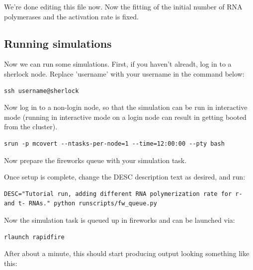 \documentclass[12pt]{article}
\begin{document}
We’re done editing this file now. Now the fitting of the initial number of RNA polymerases and the activation rate is fixed. 




\subsection{Running simulations}

Now we can run some simulations. First, if you haven't alreadt, log in to a sherlock node. Replace 'username' with your username in the command below:

\lstset{language=bash}
\begin{lstlisting}
ssh username@sherlock
\end{lstlisting}

Now log in to a non-login node, so that the simulation can be run in interactive mode (running in interactive mode on a login node can result in getting booted from the cluster).

\begin{lstlisting}
srun -p mcovert --ntasks-per-node=1 --time=12:00:00 --pty bash
\end{lstlisting}

Now prepare the fireworks queue with your simulation task. 
\par
Once setup is complete, change the DESC description text as desired, and run:

\begin{lstlisting}
DESC="Tutorial run, adding different RNA polymerization rate for r- and t- RNAs." python runscripts/fw_queue.py
\end{lstlisting}

Now the simulation task is queued up in fireworks and can be launched via:

\begin{lstlisting}
rlaunch rapidfire
\end{lstlisting}

After about a minute, this should start producing output looking something like this:
\end{document}
